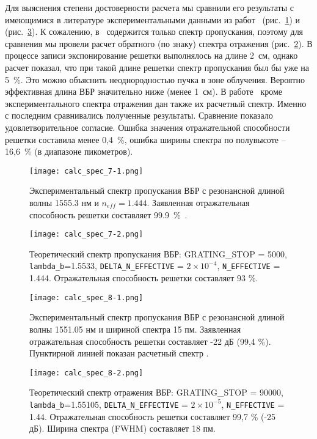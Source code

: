 Для выяснения степени достоверности расчета мы сравнили его результаты с имеющимися в литературе экспериментальными данными из работ~\cite{Harun} (рис.~\ref{fig:calc_spec_7-1}) и~\cite{Chung} (рис.~\ref{fig:calc_spec_8-1}). К сожалению, в~\cite{Harun} содержится только спектр пропускания, поэтому для сравнения мы провели расчет обратного (по знаку) спектра отражения (рис.~\ref{fig:calc_spec_7-2}). В процессе записи экспонирование решетки выполнялось на длине 2~см, однако расчет показал, что при такой длине решетки спектр пропускания был бы уже на 5~\%. Это можно объяснить неоднородностью пучка в зоне облучения. Вероятно эффективная длина ВБР значительно ниже (менее 1~см). В работе~\cite{Chung} кроме экспериментального спектра отражения дан также их расчетный спектр. Именно с последним сравнивались полученные результаты. Сравнение показало удовлетворительное согласие. Ошибка значения отражательной способности решетки составила менее 0,4~\%, ошибка ширины спектра по полувысоте -- 16,6~\% (в диапазоне пикометров).

\begin{figure}
\centering
\texttt{[image: calc\_spec\_7-1.png]}
\caption{Экспериментальный спектр пропускания ВБР с резонансной длиной волны 1555.3 нм и $n_{eff}=1.444$. Заявленная отражательная способность решетки составляет 99.9~\%~\cite{Harun}.}
\label{fig:calc_spec_7-1}
\end{figure}

\begin{figure}
\centering
\texttt{[image: calc\_spec\_7-2.png]}
\caption{Теоретический спектр пропускания ВБР: {GRATING\_STOP} = 5000, \texttt{lambda\_b}=1.5533, \texttt{DELTA\_N\_EFFECTIVE} = $2\times 10^{-4}$, \texttt{N\_EFFECTIVE} = 1.444. Отражательная способность решетки составляет 93 \%.}
\label{fig:calc_spec_7-2}
\end{figure}

\begin{figure}
\centering
\texttt{[image: calc\_spec\_8-1.png]}
\caption{Экспериментальный спектр пропускания ВБР с резонансной длиной волны 1551.05 нм и шириной спектра 15 пм. Заявленная отражательная способность решетки составляет -22 дБ (99,4 \%). Пунктирной линией показан расчетный спектр \cite{Chung}.}
\label{fig:calc_spec_8-1}
\end{figure}

\begin{figure}
\centering
\texttt{[image: calc\_spec\_8-2.png]}
\caption{Теоретический спектр отражения ВБР: {GRATING\_STOP} = 90000, \texttt{lambda\_b}=1.55105, \texttt{DELTA\_N\_EFFECTIVE} = $2\times 10^{-5}$, \texttt{N\_EFFECTIVE} = 1.44. Отражательная способность решетки составляет 99,7 \% (-25 дБ). Ширина спектра (FWHM) составляет 18 пм.}
\label{fig:calc_spec_8-2}
\end{figure}

